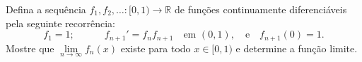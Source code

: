 Defina a sequência \(f_1,f_2,\ldots \colon [0,1)\to \mathbb{R}\) de funções continuamente diferenciáveis pela seguinte recorrência: 
\[
f_1=1; \qquad \quad f_{n+1}'=f_nf_{n+1} \quad\text{em \((0,1)\)}, \quad \text{e}\quad f_{n+1}(0)=1.
\]
Mostre que \(\lim\limits_{n\to \infty}f_n(x)\) existe para todo \(x\in [0,1)\) e determine a função limite.

